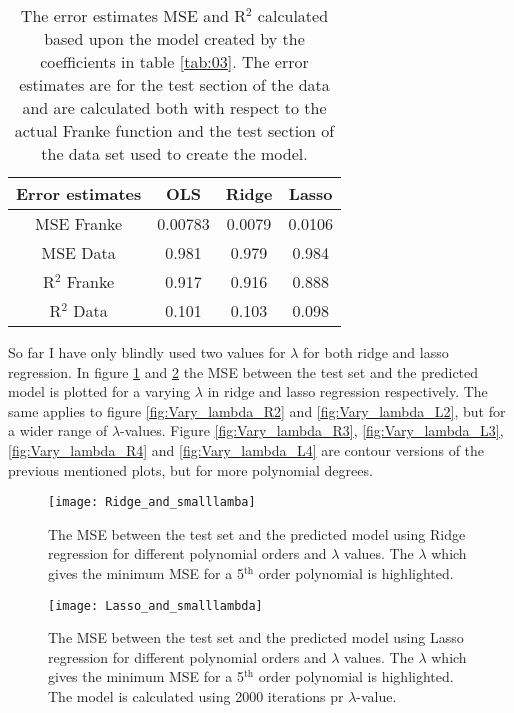 \documentclass[uio,jmp,amsmath,amssymb,reprint,nofootinbib]{revtex4-1}
\numberwithin{equation}{section}
\begin{document}
\begin{table}
\begin{tabular}{|c|c|c|c|}\hline
Error estimates & OLS & Ridge & Lasso\\ \hline
MSE Franke & 0.00783 & 0.0079 & 0.0106 \\ \hline
MSE Data & 0.981 & 0.979 & 0.984 \\ \hline
R\(^2\) Franke & 0.917 & 0.916 & 0.888 \\ \hline
R\(^2\) Data & 0.101 & 0.103 & 0.098 \\ \hline
\end{tabular}
\caption{The error estimates MSE and R\(^2\) calculated based upon the model created by the coefficients in table \ref{tab:03}. The error estimates are for the test section of the data and are calculated both with respect to the actual Franke function and the test section of the data set used to create the model.}
\label{tab:05}
\end{table}

So far I have only blindly used two values for \(\lambda\) for both ridge and lasso regression. In figure \ref{fig:Vary_lambda_R} and \ref{fig:Vary_lambda_L} the MSE between the test set and the predicted model is plotted for a varying \(\lambda\) in ridge and lasso regression respectively. The same applies to figure \ref{fig:Vary_lambda_R2} and \ref{fig:Vary_lambda_L2}, but for a wider range of \(\lambda\)-values. Figure \ref{fig:Vary_lambda_R3}, \ref{fig:Vary_lambda_L3}, \ref{fig:Vary_lambda_R4} and \ref{fig:Vary_lambda_L4} are contour versions of the previous mentioned plots, but for more polynomial degrees.

\begin{figure}[H]
    \centering
    \texttt{[image: Ridge\_and\_smalllamba]}
    \caption{The MSE between the test set and the predicted model using Ridge regression for different polynomial orders and \(\lambda\) values. The \(\lambda\) which gives the minimum MSE for a 5\(^\text{th}\) order polynomial is highlighted.}
    \label{fig:Vary_lambda_R}
\end{figure}

\begin{figure}[H]
    \centering
    \texttt{[image: Lasso\_and\_smalllambda]}
    \caption{The MSE between the test set and the predicted model using Lasso regression for different polynomial orders and \(\lambda\) values. The \(\lambda\) which gives the minimum MSE for a 5\(^\text{th}\) order polynomial is highlighted. The model is calculated using 2000 iterations pr \(\lambda\)-value.}
    \label{fig:Vary_lambda_L}
\end{figure}
\end{document}
